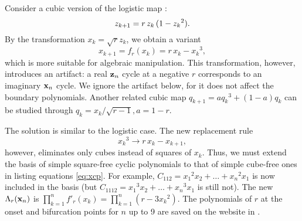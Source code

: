 \documentclass{ws-ijbc}
\begin{document}
Consider a cubic version of the logistic map :
\begin{equation}
  z_{k+1} = r \, z_k \, (1 - {z_k}^2).
  \notag
\end{equation}
%
By the transformation $x_k = \sqrt{r} z_k$,
%
we obtain a variant
\cite{strogatz}
%
\begin{equation}
  x_{k + 1} = f_r(x_k) = r \, x_k - {x_k}^3,
\label{eq:cubic}
\end{equation}
%
which is more suitable for algebraic manipulation.
%
This transformation, however, introduces an artifact:
  a real $\mathbf{z}_{n}$ cycle at a negative $r$
  corresponds to an imaginary $\mathbf{x}_{n}$ cycle.
%
We ignore the artifact below,
for it does not affect the boundary polynomials.
%
%
Another related cubic map
  $q_{k+1} = a {q_k}^3 + (1-a) q_k$ \cite{may2, brown3, brown4}
  can be studied through $q_k = x_k/\sqrt{r-1}, a = 1-r$.



The solution is similar to the logistic case.
%
The new replacement rule
\begin{equation}
  {x_k}^3 \rightarrow r \, x_k - x_{k+1},
\label{eq:cubreplace}
\end{equation}
however, eliminates only cubes instead of squares of $x_k$.
%
Thus, we must extend the basis of simple square-free cyclic polynomials
  to that of simple cube-free ones
  in listing equations \eqref{eq:xcp}.
For example,
  $C_{112} = {x_1}^2 x_2 + \dots + {x_n}^2 x_1$
  is now included in the basis
  (but
  $C_{1112} = {x_1}^3 x_2 + \dots + {x_n}^3 x_1$
  is still not).
The new $\Lambda_r(\mathbf{x}_{n})$ is
  $\prod_{k=1}^n f'_r(x_k) = \prod_{k=1}^n (r - 3 {x_k}^2)$.
%
%
The polynomials of $r$
  at the onset and bifurcation points
for $n$ up to 9
  are saved on the website in .
%
%
\end{document}
